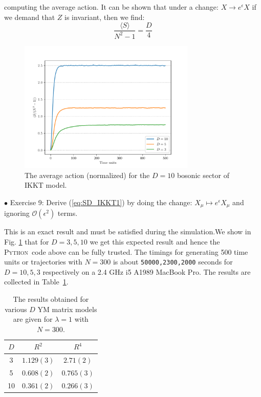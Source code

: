\documentclass[letter,11pt]{article}
\newcommand{\PY}{\textsc{Python}}
\begin{document}
computing the average action. It can be shown that under a 
change: $X \to e^{\epsilon} X$ if we demand that $Z$ is invariant, 
then we find:
\begin{equation}
\label{eq:SD_IKKT1} 
	\frac{\langle S \rangle}{N^2 - 1} = \frac{D}{4} 
\end{equation}
\begin{figure}[htbp] 
	\centering 
	\includegraphics[width=0.75\textwidth]{figs/act_allD_YM.pdf}
	\caption{\label{fig:IKKT_2}The average action (normalized) for the $D=10$ bosonic sector of IKKT model.}
\end{figure}

\begin{mdframed}[backgroundcolor=blue!3] 
	$\bullet$ Exercise 9: Derive (\ref{eq:SD_IKKT1}) by doing the change: $X_{\mu} \mapsto e^{\epsilon}X_{\mu}$ and ignoring 
	$\mathcal{O}(\epsilon^{2})$ terms.
\end{mdframed}
This is an exact result and must be satisfied during the simulation.We show in Fig. \ref{fig:IKKT_2} that for $D=3,5,10$ we get this expected result and hence the \PY~code above can be fully trusted. The timings for generating 500 time units or trajectories 
with $N=300$ is about \texttt{50000,2300,2000} seconds for $D = 10, 5, 3$ respectively on 
a 2.4 GHz i5 A1989 MacBook Pro. The results are collected in Table~\ref{table:D_IKKT_data}. 
\begin{table}[h!]
	\centering
	\begin{tabular}{||c c c||} 
		\hline
		$D$ & $R^2$ & $R^4$ \\ [0.5ex] 
		\hline\hline
		3 & $1.129(3) $ & $2.71(2) $  \\ 
		5 & $0.608(2) $ & $0.765(3) $  \\
		10 & $0.361(2)$ & $0.266(3)$
		 \\ [1ex] 
		\hline 
	\end{tabular}
\caption{The results obtained for various $D$ YM matrix models are given for $\lambda=1$ with $N=300$.}
\label{table:D_IKKT_data}
\end{table}
\end{document}
